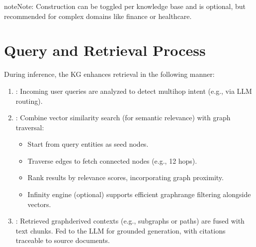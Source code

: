 \documentclass[letterpaper,10pt,english]{sphinxmanual}
\begin{document}
\begin{sphinxadmonition}{note}{Note:}
\sphinxAtStartPar
Construction can be toggled per knowledge base and is optional, but recommended for complex domains like finance or healthcare.
\end{sphinxadmonition}


\section{Query and Retrieval Process}
\label{\detokenize{graph:query-and-retrieval-process}}
\sphinxAtStartPar
During inference, the KG enhances retrieval in the following manner:
\begin{enumerate}
%
\item {} 
\sphinxAtStartPar
{}:
\sphinxhyphen{} Incoming user queries are analyzed to detect multi\sphinxhyphen{}hop intent (e.g., via LLM routing).

\item {} 
\sphinxAtStartPar
{}:
\sphinxhyphen{} Combine vector similarity search (for semantic relevance) with graph traversal:
\begin{itemize}
\item {} 
\sphinxAtStartPar
Start from query entities as seed nodes.

\item {} 
\sphinxAtStartPar
Traverse edges to fetch connected nodes (e.g., 1\sphinxhyphen{}2 hops).

\item {} 
\sphinxAtStartPar
Rank results by relevance scores, incorporating graph proximity.

\end{itemize}
\begin{itemize}
\item {} 
\sphinxAtStartPar
Infinity engine (optional) supports efficient graph\sphinxhyphen{}range filtering alongside vectors.

\end{itemize}

\item {} 
\sphinxAtStartPar
{}:
\sphinxhyphen{} Retrieved graph\sphinxhyphen{}derived contexts (e.g., subgraphs or paths) are fused with text chunks.
\sphinxhyphen{} Fed to the LLM for grounded generation, with citations traceable to source documents.

\end{enumerate}
\end{document}
